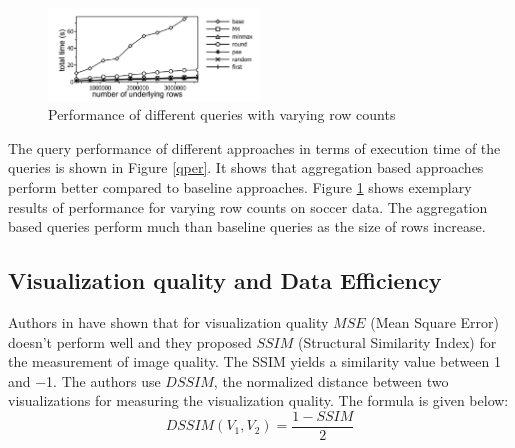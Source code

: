 \begin{figure}
	\includegraphics[width=0.5\textwidth]{pv}
	\caption{Performance of different queries with varying row counts}
	\label{vr}
\end{figure}

The query performance of different approaches in terms of execution time of the queries is shown in Figure \ref{qper}. It shows that aggregation based approaches perform better compared to baseline approaches. Figure \ref{vr} shows exemplary results of performance  for varying row counts on soccer data. The aggregation based queries perform much than baseline queries as the size of rows increase. 

\subsection{Visualization quality and Data Efficiency}
Authors in \cite{wang2004image} have shown that for visualization quality $MSE$ (Mean Square Error) doesn't perform well and they proposed $SSIM$ (Structural
Similarity Index) for the measurement of image quality. The SSIM yields a similarity
value between 1 and −1. The authors use $DSSIM$, the normalized distance between two visualizations for measuring the visualization quality. The formula is given below:
\begin{equation}
DSSIM(V_1, V_2) = \frac{1 - SSIM}{2}
\end{equation}
